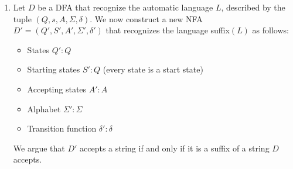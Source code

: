 \documentclass[12pt]{article}
\begin{document}
\begin{solution}
\begin{enumerate}
        But by construction, we removed all outgoing transitions from accepting states in $D$. Thus, for any $a \in \Sigma$, we have
        \[
        \delta_N(q', a) = \emptyset.
        \]
        This means that rev$(w) \notin L(N)$, a contradiction. 
        Hence, $\mathrm{rev}(w)$ has no proper suffix in $L$, and hence $\mathrm{rev}(w) \in \mathrm{nosuffix}(L)$.
        
        $(\impliedby)$

        Assume $ w\in \text{nosuffix}(L)$. Then there exists some path $\delta^\star(s_D, w)  = q\in A$, and no proper suffix of $w$ is in $L$, meaning there is no shorter subset of this path that leads to acceptance. Then by construction $\delta'_N(s_N, \text{rev}(w)) = s_D \in A_N$. Hence, rev$(w) \in L(N)$.

        Hence, $L(N) = $rev(nosuffix$(L)$) and it is automatic. Moreover from the previous worksheet we know that rev(rev(nosuffix$(L)$)) = nosuffix$(L)$ is also automatic. 

        \newpage 

        \item Let $D$ be a DFA that recognize the automatic language $L$, described by the tuple $(Q,s,A,\Sigma, \delta)$. We now construct a new NFA $D' = (Q', S', A', \Sigma', \delta')$ that recognizes the language suffix$(L)$ as follows: 
        \begin{itemize}
            \item States $Q': Q$
            \item Starting states $S': Q$ (every state is a start state)
            \item Accepting states $A': A$
            \item Alphabet $\Sigma' : \Sigma$ 
            \item Transition function $\delta': \delta$ 
        \end{itemize}
        We argue that $D'$ accepts a string if and only if it is a suffix of a string $D$ accepts.    
        

\end{enumerate}
\end{solution}
\end{document}
